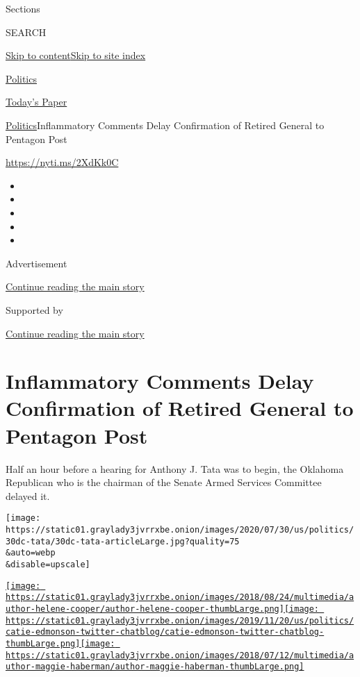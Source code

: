 Sections

SEARCH

\protect\hyperlink{site-content}{Skip to
content}\protect\hyperlink{site-index}{Skip to site index}

\href{https://www.nytimes3xbfgragh.onion/section/politics}{Politics}

\href{https://myaccount.nytimes3xbfgragh.onion/auth/login?response_type=cookie\&client_id=vi}{}

\href{https://www.nytimes3xbfgragh.onion/section/todayspaper}{Today's
Paper}

\href{/section/politics}{Politics}\textbar{}Inflammatory Comments Delay
Confirmation of Retired General to Pentagon Post

\url{https://nyti.ms/2XdKk0C}

\begin{itemize}
\item
\item
\item
\item
\item
\end{itemize}

Advertisement

\protect\hyperlink{after-top}{Continue reading the main story}

Supported by

\protect\hyperlink{after-sponsor}{Continue reading the main story}

\hypertarget{inflammatory-comments-delay-confirmation-of-retired-general-to-pentagon-post}{%
\section{Inflammatory Comments Delay Confirmation of Retired General to
Pentagon
Post}\label{inflammatory-comments-delay-confirmation-of-retired-general-to-pentagon-post}}

Half an hour before a hearing for Anthony J. Tata was to begin, the
Oklahoma Republican who is the chairman of the Senate Armed Services
Committee delayed it.

\texttt{[image: https://static01.graylady3jvrrxbe.onion/images/2020/07/30/us/politics/30dc-tata/30dc-tata-articleLarge.jpg?quality=75\\\&auto=webp\\\&disable=upscale]}

\href{https://www.nytimes3xbfgragh.onion/by/helene-cooper}{\texttt{[image: https://static01.graylady3jvrrxbe.onion/images/2018/08/24/multimedia/author-helene-cooper/author-helene-cooper-thumbLarge.png]}}\href{https://www.nytimes3xbfgragh.onion/by/catie-edmondson}{\texttt{[image: https://static01.graylady3jvrrxbe.onion/images/2019/11/20/us/politics/catie-edmonson-twitter-chatblog/catie-edmonson-twitter-chatblog-thumbLarge.png]}}\href{https://www.nytimes3xbfgragh.onion/by/maggie-haberman}{\texttt{[image: https://static01.graylady3jvrrxbe.onion/images/2018/07/12/multimedia/author-maggie-haberman/author-maggie-haberman-thumbLarge.png]}}

